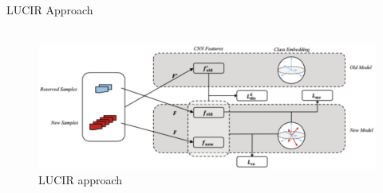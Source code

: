 \documentclass[aspectratio=169, xcolor=dvipsnames]{beamer}
\begin{document}
\begin{frame}{LUCIR Approach}
      \framesubtitle{}%
      
      \vspace{-0.5cm}
      \begin{columns}
      \vspace{-0.5cm}
      \begin{figure}[ht!]
            \centering
            \includegraphics[width=1.05\textwidth]{images/lucir_approach.pdf}
            \caption{LUCIR approach\footnotemark[13]}
      \end{figure}
      

\end{columns}
\end{frame}
\end{document}
